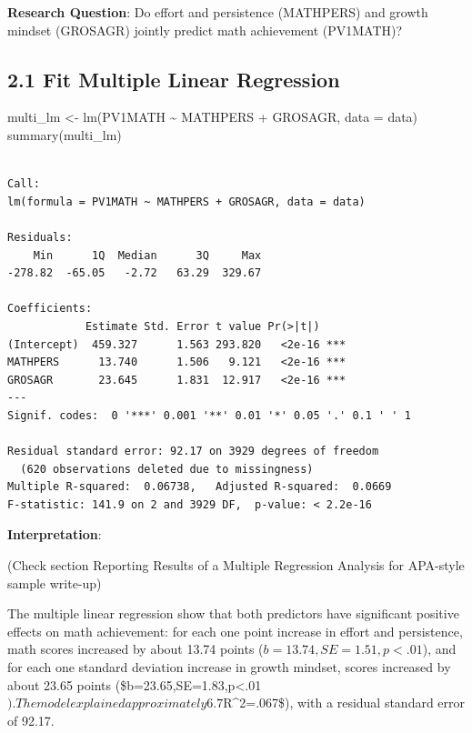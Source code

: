 \documentclass[
  letterpaper,
  DIV=11,
  numbers=noendperiod]{scrreprt}
\newenvironment{Shaded}{\begin{snugshade}}{\end{snugshade}}
\newcommand{\AttributeTok}[1]{\textcolor[rgb]{0.40,0.45,0.13}{#1}}
\newcommand{\FunctionTok}[1]{\textcolor[rgb]{0.28,0.35,0.67}{#1}}
\newcommand{\NormalTok}[1]{\textcolor[rgb]{0.00,0.23,0.31}{#1}}
\newcommand{\OtherTok}[1]{\textcolor[rgb]{0.00,0.23,0.31}{#1}}
\newcommand{\SpecialCharTok}[1]{\textcolor[rgb]{0.37,0.37,0.37}{#1}}
\begin{document}
\textbf{Research Question}: Do effort and persistence (MATHPERS) and
growth mindset (GROSAGR) jointly predict math achievement (PV1MATH)?

\subsection*{2.1 Fit Multiple Linear
Regression}\label{fit-multiple-linear-regression}

\begin{Shaded}
\begin{Highlighting}[]
\NormalTok{multi\_lm }\OtherTok{\textless{}{-}} \FunctionTok{lm}\NormalTok{(PV1MATH }\SpecialCharTok{\textasciitilde{}}\NormalTok{ MATHPERS }\SpecialCharTok{+}\NormalTok{ GROSAGR, }\AttributeTok{data =}\NormalTok{ data) }
\FunctionTok{summary}\NormalTok{(multi\_lm) }
\end{Highlighting}
\end{Shaded}

\begin{verbatim}

Call:
lm(formula = PV1MATH ~ MATHPERS + GROSAGR, data = data)

Residuals:
    Min      1Q  Median      3Q     Max 
-278.82  -65.05   -2.72   63.29  329.67 

Coefficients:
            Estimate Std. Error t value Pr(>|t|)    
(Intercept)  459.327      1.563 293.820   <2e-16 ***
MATHPERS      13.740      1.506   9.121   <2e-16 ***
GROSAGR       23.645      1.831  12.917   <2e-16 ***
---
Signif. codes:  0 '***' 0.001 '**' 0.01 '*' 0.05 '.' 0.1 ' ' 1

Residual standard error: 92.17 on 3929 degrees of freedom
  (620 observations deleted due to missingness)
Multiple R-squared:  0.06738,   Adjusted R-squared:  0.0669 
F-statistic: 141.9 on 2 and 3929 DF,  p-value: < 2.2e-16
\end{verbatim}

\textbf{Interpretation}:

(Check section Reporting Results of a Multiple Regression Analysis for
APA-style sample write-up)

The multiple linear regression show that both predictors have
significant positive effects on math achievement: for each one point
increase in effort and persistence, math scores increased by about 13.74
points (\(b=13.74,SE=1.51,p<.01\)), and for each one standard deviation
increase in growth mindset, scores increased by about 23.65 points
(\$b=23.65,SE=1.83,p\textless.01
\(). The model explained approximately 6.7%
\)R\^{}2=.067\$), with a residual standard error of 92.17.
\end{document}
